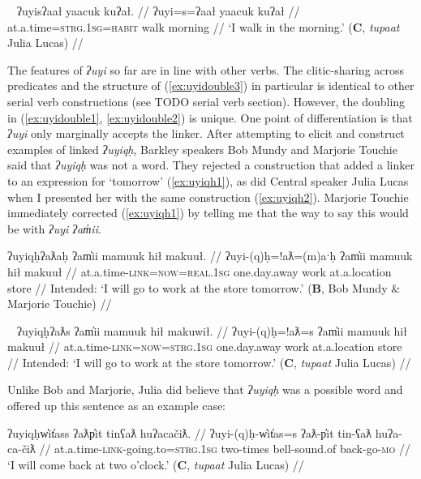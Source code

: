 \ex~ \label{ex:uyidouble3}
\begingl
\glpreamble ʔuyisʔaał yaacuk kuʔał. //
\gla ʔuyi=s=ʔaał yaacuk kuʔał //
\glb at.a.time=\textsc{strg.1sg}=\textsc{habit} walk morning //
\glft `I walk in the morning.' (\textbf{C}, \textit{tupaat} Julia Lucas) //
\endgl
\xe

The features of \textit{ʔuyi} so far are in line with other verbs. The clitic-sharing across predicates and the structure of (\ref{ex:uyidouble3}) in particular is identical to other serial verb constructions (see TODO serial verb section). However, the doubling in (\ref{ex:uyidouble1}, \ref{ex:uyidouble2}) is unique. One point of differentiation is that \textit{ʔuyi} only marginally accepts the linker. After attempting to elicit and construct examples of linked \textit{ʔuyiqḥ}, Barkley speakers Bob Mundy and Marjorie Touchie said that \textit{ʔuyiqḥ} was not a word. They rejected a construction that added a linker to an expression for `tomorrow' (\ref{ex:uyiqh1}), as did Central speaker Julia Lucas when I presented her with the same construction (\ref{ex:uyiqh2}). Marjorie Touchie immediately corrected (\ref{ex:uyiqh1}) by telling me that the way to say this would be with \textit{ʔuyi ʔam̓ii}.

\ex \label{ex:uyiqh1}
\begingl
\glpreamble *ʔuyiqḥʔaƛaḥ ʔam̓ii mamuuk hił makuuł. //
\gla ʔuyi-(q)ḥ=!aƛ=(m)aˑḥ ʔam̓ii mamuuk hił makuuł //
\glb at.a.time-\textsc{link}=\textsc{now}=\textsc{real.1sg} one.day.away work at.a.location store //
\glft Intended: `I will go to work at the store tomorrow.' (\textbf{B}, Bob Mundy \& Marjorie Touchie) //
\endgl
\xe

\ex~ \label{ex:uyiqh2}
\begingl
\glpreamble *ʔuyiqḥʔaƛs ʔam̓ii mamuuk hił makuwił. //
\gla ʔuyi-(q)ḥ=!aƛ=s ʔam̓ii mamuuk hił makuuł //
\glb at.a.time-\textsc{link}=\textsc{now}=\textsc{strg.1sg} one.day.away work at.a.location store //
\glft Intended: `I will go to work at the store tomorrow.' (\textbf{C}, \textit{tupaat} Julia Lucas) //
\endgl
\xe

Unlike Bob and Marjorie, Julia did believe that \textit{ʔuyiqḥ} was a possible word and offered up this sentence as an example case:

\ex \label{ex:uyiqh3}
\begingl
\glpreamble ʔuyiqḥw̓it̓ass ʔaƛp̓it tinʕaƛ huʔacačiƛ. //
\gla ʔuyi-(q)ḥ-w̓it̓as=s ʔaƛ-p̓it tin-ʕaƛ huʔa-ca-čiƛ //
\glb at.a.time-\textsc{link}-going.to=\textsc{strg.1sg} two-times bell-sound.of back-go-\textsc{mo} //
\glft `I will come back at two o'clock.' (\textbf{C}, \textit{tupaat} Julia Lucas) //
\endgl
\xe

